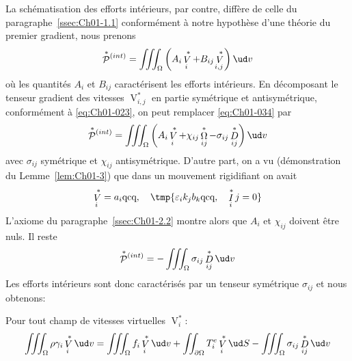 La schématisation des efforts intérieurs, par contre, diffère de celle du paragraphe~\ref{ssec:Ch01-1.1} conformément à notre hypothèse d'une théorie du premier gradient, nous prenons
\begin{equation}
    \mathop{\mathcal{P}}^{\ast}{\!}^{(int)} = \iiint_{\Omega} \left( A_i \mathop{V}^{\ast}_i + B_{ij} \mathop{V}^{\ast}_{i,j} \right) \ud v
    \label{eq:Ch01-034}
\end{equation}
où les quantités $A_i$ et $B_{ij}$ caractérisent les efforts intérieurs.
En décomposant le tenseur gradient des vitesses $\mathop{V}^{\ast}_{i,j}$ en partie symétrique et antisymétrique, conformément à \eqref{eq:Ch01-023}, on peut remplacer \eqref{eq:Ch01-034} par
\begin{equation}
    \mathop{\mathcal{P}}^{\ast}{\!}^{(int)} = \iiint_{\Omega} \left( A_i \mathop{V}^{\ast}_i + \chi_{ij} \mathop{\Omega}^{\ast}_{ij} - \sigma_{ij} \mathop{D}^{\ast}_{ij} \right) \ud v
    \label{eq:Ch01-035} 
\end{equation}
avec $\sigma_{ij}$ symétrique et $\chi_{ij}$ antisymétrique.
D'autre part, on a vu (démonstration du Lemme~\ref{lem:Ch01-3}) que dans un mouvement rigidifiant on avait
\begin{equation}
    \mathop{V}^{\ast}_i = a_i \text{qcq}, \quad \tmp{\varepsilon_i k_j b_k \text{qcq}, \quad \mathop{I}^{\ast}_ij = 0}
    \label{eq:Ch01-036}
\end{equation}
L'axiome du paragraphe~\ref{ssec:Ch01-2.2} montre alors que $A_i$ et $\chi_{ij}$ doivent être nuls.
Il reste
\begin{equation}
    \mathop{\mathcal{P}}^{\ast}{\!}^{(int)} = -\iiint_{\Omega} \sigma_{ij} \mathop{D}^{\ast}_{ij} \ud v
    \label{eq:Ch01-037}
\end{equation}
Les efforts intérieurs sont donc caractérisés par un tenseur symétrique $\sigma_{ij}$ et nous obtenons:
\begin{Principe}
Pour tout champ de vitesses virtuelles $\mathop{V}^{\ast}_i$:
    \begin{equation}
        \iiint_{\Omega} \rho \gamma_i \mathop{V}^{\ast}_i \ud v = \iiint_{\Omega} f_i \mathop{V}^{\ast}_i \ud v + \iint_{\partial \Omega} T_i^e \mathop{V}^{\ast}_i \ud S - \iiint_{\Omega} \sigma_{ij} \mathop{D}^{\ast}_{ij} \ud v
        \label{eq:Ch01-038}
    \end{equation}
\end{Principe}

